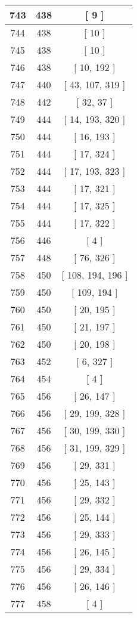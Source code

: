 \begin{center}
\begin{longtable}[H]{|| c c c ||}
\hline
743 & 438 & [ 9 ] \\ 
\hline
744 & 438 & [ 10 ] \\ 
\hline
745 & 438 & [ 10 ] \\ 
\hline
746 & 438 & [ 10, 192 ] \\ 
\hline
747 & 440 & [ 43, 107, 319 ] \\ 
\hline
748 & 442 & [ 32, 37 ] \\ 
\hline
749 & 444 & [ 14, 193, 320 ] \\ 
\hline
750 & 444 & [ 16, 193 ] \\ 
\hline
751 & 444 & [ 17, 324 ] \\ 
\hline
752 & 444 & [ 17, 193, 323 ] \\ 
\hline
753 & 444 & [ 17, 321 ] \\ 
\hline
754 & 444 & [ 17, 325 ] \\ 
\hline
755 & 444 & [ 17, 322 ] \\ 
\hline
756 & 446 & [ 4 ] \\ 
\hline
757 & 448 & [ 76, 326 ] \\ 
\hline
758 & 450 & [ 108, 194, 196 ] \\ 
\hline
759 & 450 & [ 109, 194 ] \\ 
\hline
760 & 450 & [ 20, 195 ] \\ 
\hline
761 & 450 & [ 21, 197 ] \\ 
\hline
762 & 450 & [ 20, 198 ] \\ 
\hline
763 & 452 & [ 6, 327 ] \\ 
\hline
764 & 454 & [ 4 ] \\ 
\hline
765 & 456 & [ 26, 147 ] \\ 
\hline
766 & 456 & [ 29, 199, 328 ] \\ 
\hline
767 & 456 & [ 30, 199, 330 ] \\ 
\hline
768 & 456 & [ 31, 199, 329 ] \\ 
\hline
769 & 456 & [ 29, 331 ] \\ 
\hline
770 & 456 & [ 25, 143 ] \\ 
\hline
771 & 456 & [ 29, 332 ] \\ 
\hline
772 & 456 & [ 25, 144 ] \\ 
\hline
773 & 456 & [ 29, 333 ] \\ 
\hline
774 & 456 & [ 26, 145 ] \\ 
\hline
775 & 456 & [ 29, 334 ] \\ 
\hline
776 & 456 & [ 26, 146 ] \\ 
\hline
777 & 458 & [ 4 ] \\ 

\end{longtable}
\end{center}
